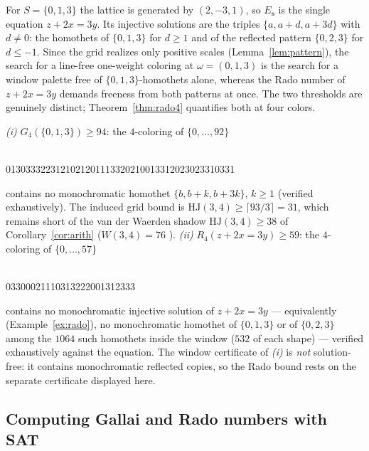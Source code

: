 \documentclass[12pt]{article}
\newcommand{\HJ}{\mathrm{HJ}}
\newcommand{\Wvdw}{W}
\begin{document}
\begin{example}\label{ex:rado}
For $S=\{0,1,3\}$ the lattice is generated by $(2,-3,1)$, so
$E_{\mathbf{s}}$ is the single equation $z+2x=3y$. Its injective
solutions are the triples $\{a,a+d,a+3d\}$ with $d\ne 0$: the
homothets of $\{0,1,3\}$ for $d\ge 1$ and of the reflected pattern
$\{0,2,3\}$ for $d\le -1$. Since the grid realizes only positive
scales (Lemma~\ref{lem:pattern}), the search for a line-free
one-weight coloring at $\omega=(0,1,3)$ is the search for a window
palette free of $\{0,1,3\}$-homothets alone, whereas the Rado number
of $z+2x=3y$ demands freeness from both patterns at once. The two
thresholds are genuinely distinct; Theorem~\ref{thm:rado4} quantifies
both at four colors.
\end{example}

\begin{theorem}\label{thm:rado4}
\emph{(i)} $G_{4}(\{0,1,3\})\ge 94$: the $4$-coloring of
$\{0,\dots,92\}$
\begin{center}\\
0130333223121021201113320210013312023023310331
\end{center}
contains no monochromatic homothet $\{b,b+k,b+3k\}$, $k\ge 1$
\textup{(}verified exhaustively\textup{)}. The induced grid bound is
$\HJ(3,4)\ge\lceil 93/3\rceil=31$, which remains short of the van der
Waerden shadow $\HJ(3,4)\ge 38$ of Corollary~\ref{cor:arith}
\textup{(}$\Wvdw(3,4)=76$ \cite{LandmanRobertson}\textup{)}.
\emph{(ii)} $R_{4}(z+2x=3y)\ge 59$: the $4$-coloring of
$\{0,\dots,57\}$
\begin{center}\\
03300021110313222001312333
\end{center}
contains no monochromatic injective solution of $z+2x=3y$ ---
equivalently \textup{(}Example~\ref{ex:rado}\textup{)}, no
monochromatic homothet of $\{0,1,3\}$ or of $\{0,2,3\}$ among the
$1064$ such homothets inside the window ($532$ of each shape) ---
verified exhaustively against the equation. The window certificate
of \emph{(i)} is \emph{not} solution-free: it contains monochromatic
reflected copies, so the Rado bound rests on the separate
certificate displayed here.
\end{theorem}


\subsection{Computing Gallai and Rado numbers with SAT}\label{sec:sat-gallai}
\end{document}
